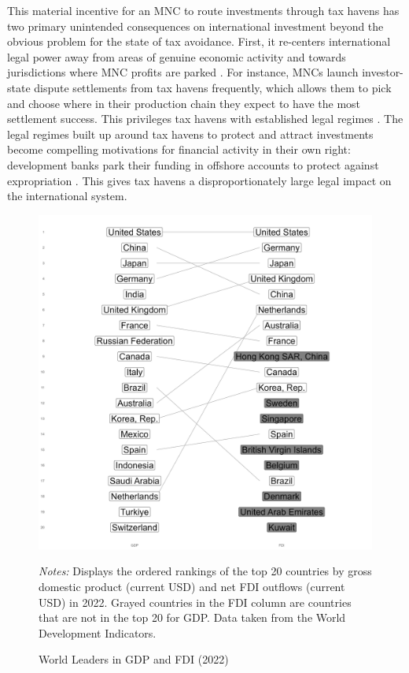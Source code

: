 \documentclass[11pt, titlepage]{article} %
\newcommand{\floatnotes}[2][Notes: ]{%
  \par\medskip%
  \begingroup%
  \begin{minipage}{0.9\linewidth}
  \raggedright\footnotesize%
  \emph{#1}#2\par
  \end{minipage}\endgroup%
}
\begin{document}
This material incentive for an MNC to route investments through tax havens has two primary unintended consequences on international investment beyond the obvious problem for the state of tax avoidance. First, it re-centers international legal power away from areas of genuine economic activity and towards jurisdictions where MNC profits are parked \parencite{sharmanCanariesCoalMine2012}. For instance, MNCs launch investor-state dispute settlements from tax havens frequently, which allows them to pick and choose where in their production chain they expect to have the most settlement success. This privileges tax havens with established legal regimes \parencite{thrallSpilloverEffectsInternational2021}. The legal regimes built up around tax havens to protect and attract investments become compelling motivations for financial activity in their own right: development banks park their funding in offshore accounts to protect against expropriation \parencite{carterWhyDevelopmentFinance2017}. This gives tax havens a disproportionately large legal impact on the international system.

\begin{figure}[t!]%
    \centering
       \includegraphics[width=.85\linewidth, keepaspectratio]{fdi_plot_2022.png}
\caption{World Leaders in GDP and FDI (2022)}
\floatnotes{Displays the ordered rankings of the top 20 countries by gross domestic product (current USD) and net FDI outflows (current USD) in 2022. Grayed countries in the FDI column are countries that are not in the top 20 for GDP. Data taken from the World Development Indicators.}
\label{fig:fdi_plot_2022.png}%
\end{figure}
\end{document}
